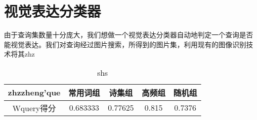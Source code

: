 \chapter{视觉表达分类器}

由于查询集数量十分庞大，我们想做一个视觉表达分类器自动地判定一个查询是否能视觉表达。我们对查询经过图片搜索，所得到的图片集，利用现有的图像识别技术将其zhz

\begin{table}[htbp]
\centering
\caption{shs} \label{tab:poem_result}
\begin{tabular}{ |c|c|c|c|c|}
    \hline
		zhzzheng'que & 常用词组 & 诗集组 &  高频组 & 随机组 \\
	\hline 
		Wquery得分 & 0.683333 & 0.77625   & 0.815 & 0.7376 \\
 	\hline
\end{tabular}
\end{table}